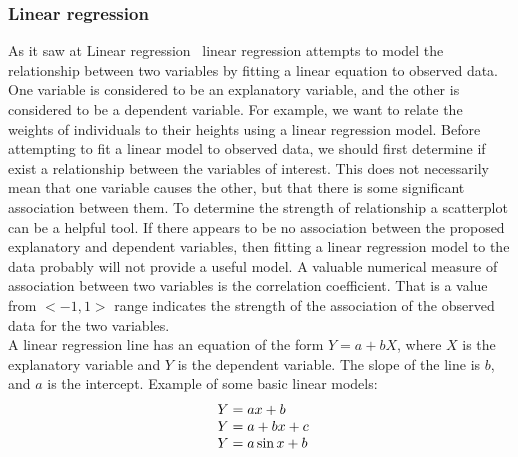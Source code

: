 \subsubsection{Linear regression} \label{sec:linear}
As it saw at Linear regression~\cite{linear} linear regression attempts to model the relationship between two variables by fitting a linear equation to observed data.
One variable is considered to be an explanatory variable, and the other is considered to be a dependent variable.
For example, we want to relate the weights of individuals to their heights using a linear regression model.
Before attempting to fit a linear model to observed data, we should first determine if exist a relationship between the variables of interest.
This does not necessarily mean that one variable causes the other, but that there is some significant association between them.
To determine the strength of relationship a scatterplot can be a helpful tool.
If there appears to be no association between the proposed explanatory and dependent variables, then fitting a linear regression
model to the data probably will not provide a useful model.
A valuable numerical measure of association between two variables is the correlation coefficient.
That is a value from $<-1, 1>$ range indicates the strength of the association of the observed data for the two variables.\\
A linear regression line has an equation of the form $Y = a + bX$, where $X$ is the explanatory variable and $Y$ is the dependent variable.
The slope of the line is $b$, and $a$ is the intercept.
Example of some basic linear models:\\
\begin{equation} \label{eq:4}
\begin{array}{l@{}l}
	Y = ax + b\\
	Y = a + bx + c\\
	Y = a\sin x + b\\
\end{array}
\end{equation}

